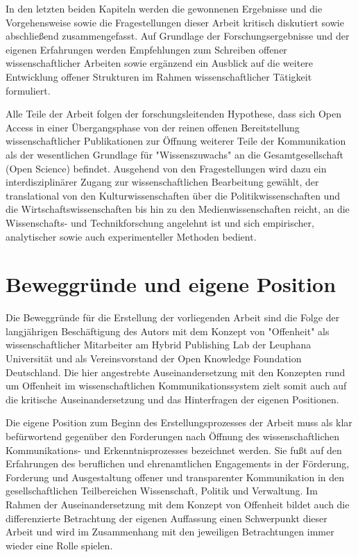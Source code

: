 In den letzten beiden Kapiteln werden die gewonnenen Ergebnisse und die Vorgehensweise sowie die Fragestellungen dieser Arbeit kritisch diskutiert sowie abschließend zusammengefasst. Auf Grundlage der Forschungsergebnisse und der eigenen Erfahrungen werden Empfehlungen zum Schreiben offener wissenschaftlicher Arbeiten sowie ergänzend ein Ausblick auf die weitere Entwicklung offener Strukturen im Rahmen wissenschaftlicher Tätigkeit formuliert.

Alle Teile der Arbeit folgen der forschungsleitenden Hypothese, dass sich Open Access in einer Übergangsphase von der reinen offenen Bereitstellung wissenschaftlicher Publikationen zur Öffnung weiterer Teile der Kommunikation als der wesentlichen Grundlage für "Wissenszuwachs" \cite[:157]{Luhmann_1998} an die Gesamtgesellschaft (Open Science) befindet. Ausgehend von den Fragestellungen wird dazu ein interdisziplinärer Zugang zur wissenschaftlichen Bearbeitung gewählt, der translational von den Kulturwissenschaften über die Politikwissenschaften und die Wirtschaftswissenschaften bis hin zu den Medienwissenschaften reicht, an die Wissenschafts- und Technikforschung angelehnt ist und sich empirischer, analytischer sowie auch experimenteller Methoden bedient.

\section{Beweggründe und eigene Position}

Die Beweggründe für die Erstellung der vorliegenden Arbeit sind die Folge der langjährigen Beschäftigung des Autors mit dem Konzept von "Offenheit" als wissenschaftlicher Mitarbeiter am Hybrid Publishing Lab der Leuphana Universität und als Vereinsvorstand der Open Knowledge Foundation Deutschland. Die hier angestrebte Auseinandersetzung mit den Konzepten rund um Offenheit im wissenschaftlichen Kommunikationssystem zielt somit auch auf die kritische Auseinandersetzung und das Hinterfragen der eigenen Positionen.

Die eigene Position zum Beginn des Erstellungsprozesses der Arbeit muss als klar befürwortend gegenüber den Forderungen nach Öffnung des wissenschaftlichen Kommunikations- und Erkenntnisprozesses bezeichnet werden. Sie fußt auf den Erfahrungen des beruflichen und ehrenamtlichen Engagements in der Förderung, Forderung und Ausgestaltung offener und transparenter Kommunikation in den gesellschaftlichen Teilbereichen Wissenschaft, Politik und Verwaltung. Im Rahmen der Auseinandersetzung mit dem Konzept von Offenheit bildet auch die differenzierte Betrachtung der eigenen Auffassung einen Schwerpunkt dieser Arbeit und wird im Zusammenhang mit den jeweiligen Betrachtungen immer wieder eine Rolle spielen.

